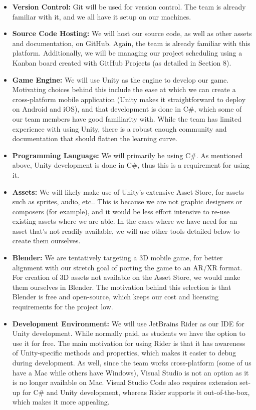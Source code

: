 \documentclass{article}
\begin{document}
\begin{itemize}
    \item \textbf{Version Control:} Git will be used for version control. The team is already familiar with it, and we all
    have it setup on our machines.

    \item \textbf{Source Code Hosting:} We will host our source code, as well as other assets and documentation, on GitHub.
    Again, the team is already familiar with this platform. Additionally, we will be managing our project scheduling using a
    Kanban board created with GitHub Projects (as detailed in Section 8).

    \item \textbf{Game Engine:} We will use Unity as the engine to develop our game. Motivating choices behind this include
    the ease at which we can create a cross-platform mobile application (Unity makes it straightforward to deploy on Android
    and iOS), and that development is done in C\#, which some of our team members have good familiarity with. While the team
    has limited experience with using Unity, there is a robust enough community and documentation that should flatten the
    learning curve.

    \item \textbf{Programming Language:} We will primarily be using C\#. As mentioned above, Unity development is done in
    C\#, thus this is a requirement for using it.

    \item \textbf{Assets:} We will likely make use of Unity's extensive Asset Store, for assets such as sprites, audio, etc..
    This is because we are not graphic designers or composers (for example), and it would be less effort intensive to re-use existing assets
    where we are able. In the cases where we have need for an asset that's not readily available, we will use other tools detailed below to create them ourselves.

    \item \textbf{Blender:} We are tentatively targeting a 3D mobile game, for better alignment with our stretch goal of porting
    the game to an AR/XR format. For creation of 3D assets not available on the Asset Store, we would make them ourselves in Blender.
    The motivation behind this selection is that Blender is free and open-source, which keeps our cost and licensing requirements for the project low.

    \item \textbf{Development Environment:} We will use JetBrains Rider as our IDE for Unity development. While normally paid,
    as students we have the option to use it for free. The main motivation for using Rider is that it has awareness of Unity-specific
    methods and properties, which makes it easier to debug during development. As well, since the team works cross-platform
    (some of us have a Mac while others have Windows), Visual Studio is not an option as it is no longer available on Mac.
    Visual Studio Code also requires extension set-up for C\# and Unity development, whereas Rider supports it out-of-the-box,
    which makes it more appealing.


\end{itemize}
\end{document}
